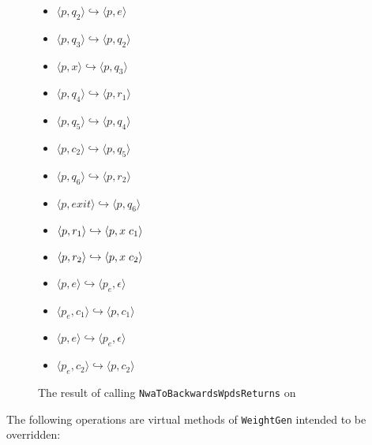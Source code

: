 \begin{figure}[p]
\begin{minipage}{0.42\textwidth}
\begin{itemize}
      \item{ $\langle p,q_2 \rangle \hookrightarrow \langle p,e \rangle$}
      \item{ $\langle p,q_3 \rangle \hookrightarrow \langle p,q_2 \rangle$}
      \item{ $\langle p,x \rangle \hookrightarrow \langle p,q_3 \rangle$}
      \item{ $\langle p,q_4 \rangle \hookrightarrow \langle p,r_1 \rangle$}
      \item{ $\langle p,q_5 \rangle \hookrightarrow \langle p,q_4 \rangle$}
      \item{ $\langle p,c_2 \rangle \hookrightarrow \langle p,q_5 \rangle$}
      \item{ $\langle p,q_6 \rangle \hookrightarrow \langle p,r_2 \rangle$}
      \item{ $\langle p,exit \rangle \hookrightarrow \langle p,q_6 \rangle$}
      \item{ $\langle p,r_1 \rangle \hookrightarrow \langle p,x \hspace{.1cm} c_1 \rangle$}
      \item{ $\langle p,r_2 \rangle \hookrightarrow \langle p,x \hspace{.1cm} c_2 \rangle$}
      \item{ $\langle p,e \rangle \hookrightarrow \langle p_e, \epsilon \rangle$}
      \item{ $\langle p_e,c_1 \rangle \hookrightarrow \langle p,c_1 \rangle$}
      \item{ $\langle p,e \rangle \hookrightarrow \langle p_e, \epsilon \rangle$}
      \item{ $\langle p_e,c_2 \rangle \hookrightarrow \langle p,c_2 \rangle$}
    \end{itemize}
    \caption{The result of calling \texttt{Nwa\-To\-Backwards\-Wpds\-Returns} on }
    \label{Fi:NwaToWpds3}
  \end{minipage}
\end{figure}


The following operations are virtual methods of \texttt{WeightGen} intended to
be overridden:

